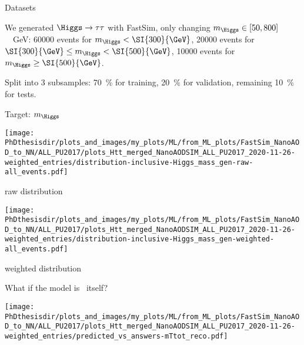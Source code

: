 \begin{frame}{Datasets}

\manip We generated $\Higgs\to\tau\tau$ with FastSim, only changing $m_{\Higgs} \in [50, 800]$~\SI{}{\GeV}:
\submanip \num{60000} events for $m_{\Higgs} < \SI{300}{\GeV}$,
\submanip \num{20000} events for $\SI{300}{\GeV} \leq m_{\Higgs} < \SI{500}{\GeV}$,
\submanip \num{10000} events for $m_{\Higgs} \geq \SI{500}{\GeV}$.

\vfill

\manip Split into 3 subsamples:
\submanip \SI{70}{\%} for training,
\submanip \SI{20}{\%} for validation,
\submanip remaining \SI{10}{\%} for tests.

\end{frame}


\begin{frame}{Target: $m_{\Higgs}$}

\begin{center}
\begin{minipage}[t]{.4\textwidth}
\begin{center}
\texttt{[image: \\PhDthesisdir/plots\_and\_images/my\_plots/ML/from\_ML\_plots/FastSim\_NanoAOD\_to\_NN/ALL\_PU2017/plots\_Htt\_merged\_NanoAODSIM\_ALL\_PU2017\_2020-11-26-weighted\_entries/distribution-inclusive-Higgs\_mass\_gen-raw-all\_events.pdf]}

raw distribution
\end{center}
\end{minipage}
\qquad\qquad
\begin{minipage}[t]{.4\textwidth}
\begin{center}
\texttt{[image: \\PhDthesisdir/plots\_and\_images/my\_plots/ML/from\_ML\_plots/FastSim\_NanoAOD\_to\_NN/ALL\_PU2017/plots\_Htt\_merged\_NanoAODSIM\_ALL\_PU2017\_2020-11-26-weighted\_entries/distribution-inclusive-Higgs\_mass\_gen-weighted-all\_events.pdf]}

weighted distribution
\end{center}
\end{minipage}
\end{center}

\end{frame}

\begin{frame}{What if the model is \mTtot\ itself?}
\begin{center}\vspace{-4pt}
\texttt{[image: \\PhDthesisdir/plots\_and\_images/my\_plots/ML/from\_ML\_plots/FastSim\_NanoAOD\_to\_NN/ALL\_PU2017/plots\_Htt\_merged\_NanoAODSIM\_ALL\_PU2017\_2020-11-26-weighted\_entries/predicted\_vs\_answers-mTtot\_reco.pdf]}
\end{center}\vspace{-5pt}
\end{frame}